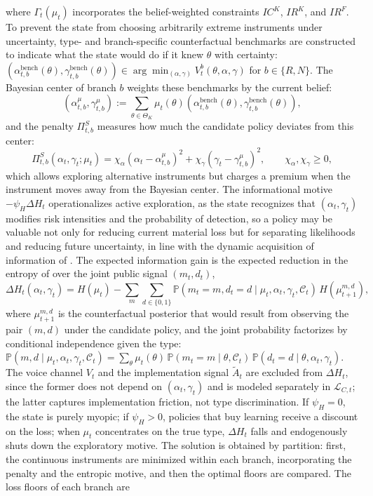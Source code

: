 \documentclass[review,authoryear,12pt]{elsarticle}
\theoremstyle{plain}
\theoremstyle{definition}
\newcommand{\Prob}{\mathbb{P}}
\newcommand{\ThetaK}{\Theta_K}
\newcommand{\1}{\mathbf{1}}
\begin{document}
where $\Gamma_t(\mu_t)$ incorporates the belief-weighted constraints $IC^K$, $IR^K$, and $IR^F$. To prevent the state from choosing arbitrarily extreme instruments under uncertainty, type- and branch-specific counterfactual benchmarks are constructed to indicate what the state would do if it knew $\theta$ with certainty: $(\alpha_{t,b}^{\mathrm{bench}}(\theta),\gamma_{t,b}^{\mathrm{bench}}(\theta)) \allowbreak \in \allowbreak \arg\min_{(\alpha,\gamma)}V_t^b(\theta,\alpha,\gamma)$ for $b\in\{R,N\}$. The Bayesian center of branch $b$ weights these benchmarks by the current belief:
\[
(\alpha_{t,b}^{\mu},\gamma_{t,b}^{\mu}):=\sum_{\theta\in\ThetaK}\mu_t(\theta)(\alpha_{t,b}^{\mathrm{bench}}(\theta),\gamma_{t,b}^{\mathrm{bench}}(\theta)),
\]
and the penalty $\Pi_{t,b}^S$ measures how much the candidate policy deviates from this center:
\begin{equation}
\Pi_{t,b}^S(\alpha_t,\gamma_t;\mu_t)=\chi_\alpha(\alpha_t-\alpha_{t,b}^{\mu})^2+\chi_\gamma(\gamma_t-\gamma_{t,b}^{\mu})^2,\qquad\chi_\alpha,\chi_\gamma\ge 0,
\label{eq:prima-desviacion}
\end{equation}
which allows exploring alternative instruments but charges a premium when the instrument moves away from the Bayesian center. The informational motive $-\psi_H\Delta H_t$ operationalizes active exploration, as the state recognizes that $(\alpha_t,\gamma_t)$ modifies risk intensities and the probability of detection, so a policy may be valuable not only for reducing current material loss but for separating likelihoods and reducing future uncertainty, in line with the dynamic acquisition of information of \citet{Zhong2022}. The expected information gain is the expected reduction in the entropy of \citet{Shannon1948} over the joint public signal $(m_t,d_t)$,
\begin{equation}
\Delta H_t(\alpha_t,\gamma_t)=H(\mu_t)-\sum_{m}\sum_{d\in\{0,1\}}\Prob(m_t=m,d_t=d\mid\mu_t,\alpha_t,\gamma_t,\mathcal{C}_t)\,H(\mu_{t+1}^{m,d}),
\label{eq:delta-H}
\end{equation}
where $\mu_{t+1}^{m,d}$ is the counterfactual posterior that would result from observing the pair $(m,d)$ under the candidate policy, and the joint probability factorizes by conditional independence given the type: $\Prob(m,d\mid\mu_t,\alpha_t,\gamma_t,\mathcal{C}_t)=\sum_{\theta}\mu_t(\theta)\,\Prob(m_t=m\mid\theta,\mathcal{C}_t)\,\Prob(d_t=d\mid\theta,\alpha_t,\gamma_t)$. The voice channel $V_t$ and the implementation signal $\tilde{A}_t$ are excluded from $\Delta H_t$, since the former does not depend on $(\alpha_t,\gamma_t)$ and is modeled separately in $\mathcal{L}_{C,t}$; the latter captures implementation friction, not type discrimination. If $\psi_H=0$, the state is purely myopic; if $\psi_H>0$, policies that buy learning receive a discount on the loss; when $\mu_t$ concentrates on the true type, $\Delta H_t$ falls and endogenously shuts down the exploratory motive. The solution is obtained by partition: first, the continuous instruments are minimized within each branch, incorporating the penalty and the entropic motive, and then the optimal floors are compared. The loss floors of each branch are
\end{document}
